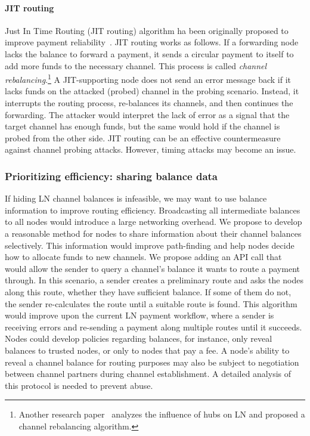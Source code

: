 \paragraph{JIT routing}
Just In Time Routing (JIT routing) algorithm ha been originally proposed to improve payment reliability~\cite{Pickhardt2019, Pickhardt2019a}.
JIT routing works as follows.
If a forwarding node lacks the balance to forward a payment, it sends a circular payment to itself to add more funds to the necessary channel.
This process is called \textit{channel rebalancing}.\footnote{Another research paper~\cite{Conoscenti2019} analyzes the influence of hubs on LN and proposed a channel rebalancing algorithm.}
A JIT-supporting node does not send an error message back if it lacks funds on the attacked (probed) channel in the probing scenario.
Instead, it interrupts the routing process, re-balances its channels, and then continues the forwarding.
The attacker would interpret the lack of error as a signal that the target channel has enough funds, but the same would hold if the channel is probed from the other side.
JIT routing can be an effective countermeasure against channel probing attacks.
However, timing attacks may become an issue.


\subsubsection*{Prioritizing efficiency: sharing balance data}

If hiding LN channel balances is infeasible, we may want to use balance information to improve routing efficiency.
Broadcasting all intermediate balances to all nodes would introduce a large networking overhead.
We propose to develop a reasonable method for nodes to share information about their channel balances selectively.
This information would improve path-finding and help nodes decide how to allocate funds to new channels.
We propose adding an API call that would allow the sender to query a channel's balance it wants to route a payment through.
In this scenario, a sender creates a preliminary route and asks the nodes along this route, whether they have sufficient balance.
If some of them do not, the sender re-calculates the route until a suitable route is found.
This algorithm would improve upon the current LN payment workflow, where a sender is receiving errors and re-sending a payment along multiple routes until it succeeds.
Nodes could develop policies regarding balances, for instance, only reveal balances to trusted nodes, or only to nodes that pay a fee.
A node's ability to reveal a channel balance for routing purposes may also be subject to negotiation between channel partners during channel establishment.
A detailed analysis of this protocol is needed to prevent abuse.


